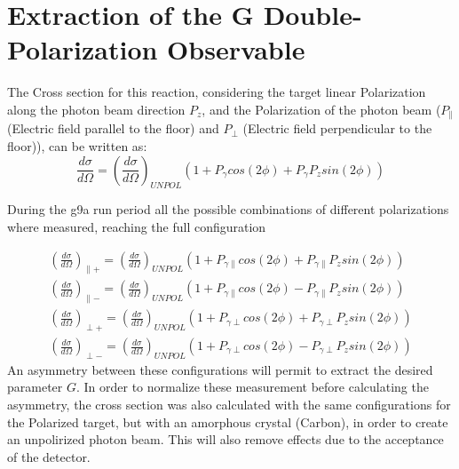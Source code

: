 \section{Extraction of the G Double-Polarization Observable}
The Cross section for this reaction, considering the target linear Polarization along the photon beam direction $P_z$, and the Polarization of the photon beam ($P_{\parallel}$ (Electric field parallel to the floor) and $P_{\perp}$ (Electric field perpendicular to the floor)), can be written as:
\begin{equation}
\frac{d\sigma}{d\Omega} = \left(\frac{d\sigma}{d\Omega}\right)_{UNPOL}  \left( 1 + P_{\gamma}cos(2\phi) + P_{\gamma} P_z sin(2\phi) \right)
\end{equation}

During the g9a run period all the possible combinations of different polarizations where measured, reaching the full configuration

\begin{eqnarray}
\left(\frac{d\sigma}{d\Omega}\right)_{\parallel +} = \left(\frac{d\sigma}{d\Omega}\right)_{UNPOL}  \left( 1 + P_{\gamma \parallel}cos(2\phi) + P_{\gamma \parallel} P_z sin(2\phi) \right) \\
\left(\frac{d\sigma}{d\Omega}\right)_{\parallel -} = \left(\frac{d\sigma}{d\Omega}\right)_{UNPOL}  \left( 1 + P_{\gamma \parallel}cos(2\phi) - P_{\gamma \parallel} P_z sin(2\phi) \right) \\
\left(\frac{d\sigma}{d\Omega}\right)_{\perp +} = \left(\frac{d\sigma}{d\Omega}\right)_{UNPOL}  \left( 1 + P_{\gamma \perp}cos(2\phi) + P_{\gamma \perp} P_z sin(2\phi) \right) \\
\left(\frac{d\sigma}{d\Omega}\right)_{\perp -} = \left(\frac{d\sigma}{d\Omega}\right)_{UNPOL}  \left( 1 + P_{\gamma \perp}cos(2\phi) - P_{\gamma \perp} P_z sin(2\phi) \right)
\end{eqnarray}
An asymmetry between these configurations will permit to extract the desired parameter $G$. In order to normalize these measurement before calculating the asymmetry, the cross section was also calculated with the same configurations for the Polarized target, but with an amorphous crystal (Carbon), in order to create an unpolirized photon beam. This will also remove effects due to the acceptance of the detector. 

